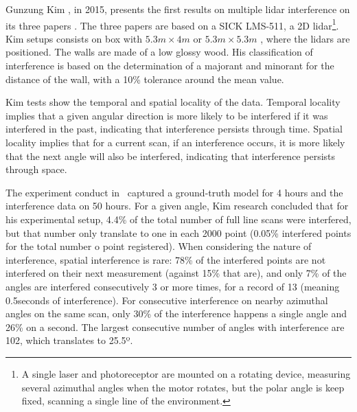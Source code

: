 Gunzung Kim \etal, in 2015, presents the first results on multiple \ac{lidar} interference on its three papers \cite{Kim2015a, Kim2015b, Kim2015c}. The three papers are based on a SICK LMS-511, a 2D \ac{lidar}\footnote{A single laser and photoreceptor are mounted on a rotating device, measuring several azimuthal angles when the motor rotates, but the polar angle is keep fixed, scanning a single line of the environment.}. Kim \etal setups consists on box with $5.3 m \times 4 m$ \cite{Kim2015a} or $5.3 m \times 5.3 m$ \cite{Kim2015b, Kim2015c}, where the \acp{lidar} are positioned. The walls are made of a low glossy wood. His classification of interference is based on the determination of a majorant and minorant for the distance of the wall, with a 10\% tolerance around the mean value.


Kim \etal tests show the temporal and spatial locality of the data. Temporal locality implies that a given angular direction is more likely to be interfered if it was interfered in the past, indicating that interference persists through time. Spatial locality implies that for a current scan, if an interference occurs, it is more likely that the next angle will also be interfered, indicating that interference persists through space. 



The experiment conduct in~\cite{Kim2015a} captured a ground-truth model for 4 hours and the interference data on 50 hours. For a given angle, Kim research concluded that for his experimental setup, 4.4\% of the total number of full line scans were interfered, but that number only translate to one in each 2000 point (0.05\% interfered points for the total number o point registered). When considering the nature of interference, spatial interference is rare: 78\% of the interfered points are not interfered on their next measurement (against 15\% that are), and only 7\% of the angles are interfered consecutively 3 or more times, for a record of 13 (meaning 0.5seconds of interference). For consecutive interference on nearby azimuthal angles on the same scan, only 30\% of the interference happens a single angle and 26\% on a second. The largest consecutive number of angles with interference are 102, which translates to 25.5º.



